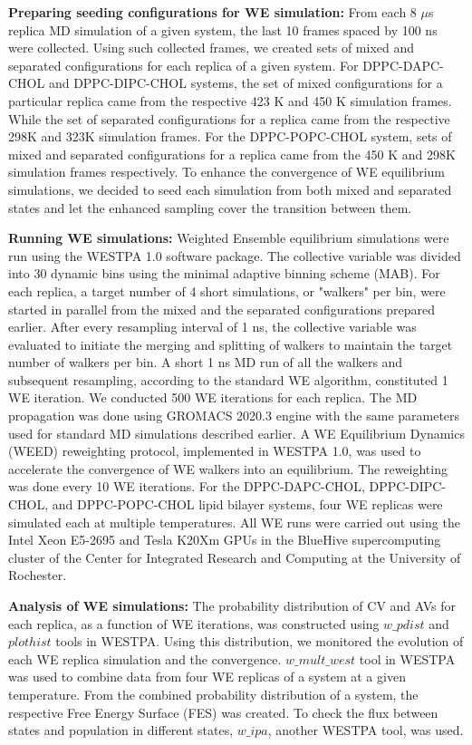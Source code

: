 \documentclass{biophys-new}
\begin{document}
\textbf{Preparing seeding configurations for WE simulation:} 
From each 8 $\mu$s replica MD simulation of a given system, the last 10 frames spaced by 100 ns were collected.
Using such collected frames, we created sets of mixed and separated configurations for each replica of a given system.
For DPPC-DAPC-CHOL and DPPC-DIPC-CHOL systems, the set of mixed configurations for a particular replica came from the respective 423 K and 450 K simulation frames. 
While the set of separated configurations for a replica came from  the respective 298K and 323K simulation frames.
For the DPPC-POPC-CHOL system, sets of mixed and separated configurations for a replica came from the 450 K and 298K simulation frames respectively.
To enhance the convergence of WE equilibrium simulations, we decided to seed each simulation from both mixed and separated states and let the enhanced sampling cover the transition between them.

\textbf{Running WE simulations:} 
Weighted Ensemble equilibrium simulations were run using the WESTPA 1.0 software package\cite{Zwier2015}.
The collective variable was divided into 30 dynamic bins using the minimal adaptive binning scheme (MAB)\cite{Torrillo2021}.
For each replica, a target number of 4 short simulations, or "walkers" per bin, were started in parallel from the mixed and the separated configurations prepared earlier.
After every resampling interval of 1 ns, the collective variable was evaluated to initiate the merging and splitting of walkers to maintain the target number of walkers per bin.
A short 1 ns MD run of all the walkers and subsequent resampling, according to the standard WE algorithm, constituted 1 WE iteration. 
We conducted 500 WE iterations for each replica.
The MD propagation was done using GROMACS 2020.3 engine with the same parameters used for standard MD simulations described earlier.
A WE Equilibrium Dynamics (WEED) reweighting protocol\cite{Bhatt2010}, implemented in WESTPA 1.0, was used to accelerate the convergence of WE walkers into an equilibrium. 
The reweighting was done every 10 WE iterations.
For the DPPC-DAPC-CHOL, DPPC-DIPC-CHOL, and DPPC-POPC-CHOL lipid bilayer systems, four WE replicas were simulated each at multiple temperatures. 
All WE runs were carried out using the Intel Xeon E5-2695 and Tesla K20Xm GPUs in the BlueHive supercomputing cluster of the Center for Integrated Research and
Computing at the University of Rochester.   

\textbf{Analysis of WE simulations:}
The probability distribution of CV and AVs for each replica, as a function of WE iterations, was constructed using $w\_pdist$ and $plothist$ tools in WESTPA.
Using this distribution, we monitored the evolution of each WE replica simulation and the convergence.
$w\_mult\_west$ tool in WESTPA was used to combine data from four WE replicas of a system at a given temperature.
From the combined probability distribution of a system, the respective Free Energy Surface (FES) was created.
To check the flux between states and population in different states, $w\_ipa$, another WESTPA tool, was used.
\end{document}
